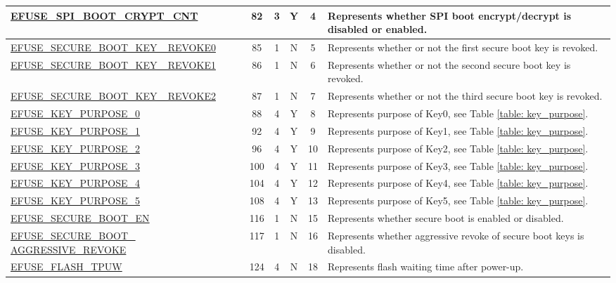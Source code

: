 \begin{longtable}[l]{ |m{5cm}|c|c|c|c|m{5cm}| }
    \hline
    \hyperref[fielddesc:EFUSESPIBOOTCRYPTCNT]{EFUSE\_SPI\_BOOT\_CRYPT\_CNT} & 82 & 3 & Y & 4 & Represents whether SPI boot encrypt/decrypt is disabled or enabled.\\
    \hline
    \hyperref[fielddesc:EFUSESECUREBOOTKEYREVOKE0]{EFUSE\_SECURE\_BOOT\_KEY\_ REVOKE0} & 85 & 1 & N & 5 & Represents whether or not the first secure boot key is revoked.\\
    \hline
    \hyperref[fielddesc:EFUSESECUREBOOTKEYREVOKE1]{EFUSE\_SECURE\_BOOT\_KEY\_ REVOKE1} & 86 & 1 & N & 6 & Represents whether or not the second secure boot key is revoked.\\
    \hline
    \hyperref[fielddesc:EFUSESECUREBOOTKEYREVOKE2]{EFUSE\_SECURE\_BOOT\_KEY\_ REVOKE2} & 87 & 1 & N & 7 & Represents whether or not the third secure boot key is revoked.\\
    \hline
    \hyperref[fielddesc:EFUSEKEYPURPOSE0]{EFUSE\_KEY\_PURPOSE\_0} & 88 & 4 & Y & 8 & Represents purpose of Key0, see Table \ref{table: key_purpose}.
    \\ \hline
    \hyperref[fielddesc:EFUSEKEYPURPOSE1]{EFUSE\_KEY\_PURPOSE\_1} & 92 & 4 & Y & 9 & Represents purpose of Key1, see Table \ref{table: key_purpose}.
    \\ \hline
    \hyperref[fielddesc:EFUSEKEYPURPOSE2]{EFUSE\_KEY\_PURPOSE\_2} & 96 & 4 & Y & 10 & Represents purpose of Key2, see Table \ref{table: key_purpose}.
    \\ \hline
    \hyperref[fielddesc:EFUSEKEYPURPOSE3]{EFUSE\_KEY\_PURPOSE\_3} & 100 & 4 & Y & 11 & Represents purpose of Key3, see Table \ref{table: key_purpose}.    
    \\ \hline
    \hyperref[fielddesc:EFUSEKEYPURPOSE4]{EFUSE\_KEY\_PURPOSE\_4} & 104 & 4 & Y & 12 & Represents purpose of Key4, see Table \ref{table: key_purpose}.    
    \\ \hline
    \hyperref[fielddesc:EFUSEKEYPURPOSE5]{EFUSE\_KEY\_PURPOSE\_5} & 108 & 4 & Y & 13 & Represents purpose of Key5, see Table \ref{table: key_purpose}.  
    \\ \hline
    \hyperref[fielddesc:EFUSESECUREBOOTEN]{EFUSE\_SECURE\_BOOT\_EN} & 116 & 1 & N & 15 & Represents whether secure boot is enabled or disabled. \\ 
    \hline
    \hyperref[fielddesc:EFUSESECUREBOOTAGGRESSIVEREVOKE]{EFUSE\_SECURE\_BOOT\_ AGGRESSIVE\_REVOKE} & 117 & 1 & N & 16 & Represents whether aggressive revoke of secure boot keys is disabled. \\
    \hline
    \hyperref[fielddesc:EFUSEFLASHTPUW]{EFUSE\_FLASH\_TPUW} & 124 & 4 & N & 18 & Represents flash waiting time after power-up.\\

\end{longtable}
